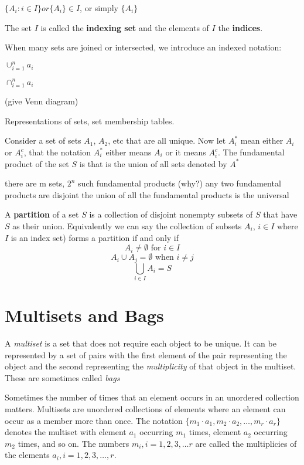 $\{A_i : i \in I\} or \{A_i\} \in I$, or simply $\{A_i\}$

The set $I$ is called the \textbf{indexing set} and the elements of $I$ the \textbf{indices}. 

When many sets are joined or intersected, we introduce an indexed notation:


$\cup _{ i=1} ^ n a _{i}$

$\cap_{ i=1} ^ n a _{i}$


(give Venn diagram)

Representations of sets, set membership tables.


\begin{definition}
Consider a set of sets $A_1$, $A_2$, etc that are all unique. 
Now let $A_i^*$ mean either $A_i$ or  $A_i^c$, that the notation $A_i^*$ either means $A_i$ or it means $A_i^c$.
The fundamental product of the set $S$ is that is the union of all sets denoted by $A^*$
\end{definition}
\begin{notes}
there are m sets, $2^n$ such fundamental products (why?)
any two fundamental products are disjoint
the union of all the fundamental products is the universal
\end{notes}



\begin{definition}
A \textbf{partition} of a set $S$ is a collection of disjoint nonempty subsets of $S$ that have $S$ as their union. Equivalently we can say the collection of subsets $A_i$, $i \in I$ where $I$ is an index set) forms a partition if and only if
$$A_i \neq \emptyset \text{  for  } i \in I$$
$$A_i \cup A_j =  \emptyset \text{  when  } i \neq j$$
$$\bigcup_{i \in I} A_i = S$$
\end{definition}

\section {Multisets and Bags} 
A \textit{multiset} is a set that does not require each object to be unique. It can be represented by a set of pairs with the first element of the pair representing the object and the second representing the \textit{multiplicity} of that object in the multiset. These are sometimes called \textit{bags}

Sometimes the number of times that an element occurs in an unordered collection matters. Multisets are unordered collections of elements where an element can occur as a member more than once. The notation $\{m_1 \cdot a_1, m_2 \cdot a_2, \dots ,m_r \cdot a_r\}$ denotes the multiset with element $a_1$ occurring $m_1$ times, element $a_2$ occurring $m_2$ times, and so on. The numbers $m_i, i=1,2,3, \dots r$ are called the multiplicies of the elements $a_i, i=1,2,3, \dots ,r$.

